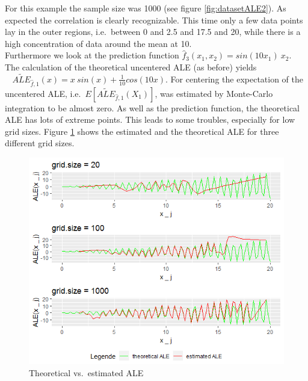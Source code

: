 \documentclass[
]{krantz}
\begin{document}
For this example the sample size was 1000 (see figure \ref{fig:datasetALE2}). As expected the correlation is clearly recognizable. This time only a few data points lay in the outer regions, i.e.~between 0 and 2.5 and 17.5 and 20, while there is a high concentration of data around the mean at 10.\\
Furthermore we look at the prediction function \(\hat{f}_3(x_1,x_2) = sin(10x_1)~x_2\). The calculation of the theoretical uncentered ALE (as before) yields \(~~~~\widetilde{ALE}_{\hat{f},1}(x) = x~sin(x) + \frac{1}{10}cos(10x)\). For centering the expectation of the uncentered ALE, i.e.~\(E[\widetilde{ALE}_{\hat{f},1}(X_1)]\), was estimated by Monte-Carlo integration to be almost zero.
As well as the prediction function, the theoretical ALE has lots of extreme points. This leads to some troubles, especially for low grid sizes.
Figure \ref{fig:example33gs} shows the estimated and the theoretical ALE for three different grid sizes.

\begin{figure}
\includegraphics[width=1\linewidth]{images/ALE_2_example3_3gs_} \caption{Theoretical vs.~estimated ALE}\label{fig:example33gs}
\end{figure}
\end{document}
